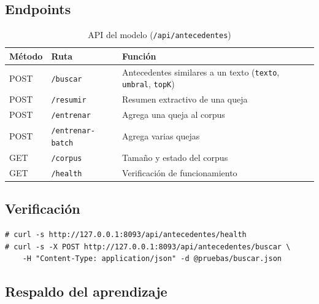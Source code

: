 \subsection{Endpoints}
\begin{table}[H]
\centering
\caption{API del modelo (\texttt{/api/antecedentes})}
\begin{tabular}{llp{7cm}}
\toprule
\textbf{Método} & \textbf{Ruta} & \textbf{Función} \\
\midrule
POST & \texttt{/buscar} & Antecedentes similares a un texto (\texttt{texto}, \texttt{umbral}, \texttt{topK}) \\
POST & \texttt{/resumir} & Resumen extractivo de una queja \\
POST & \texttt{/entrenar} & Agrega una queja al corpus \\
POST & \texttt{/entrenar-batch} & Agrega varias quejas \\
GET & \texttt{/corpus} & Tamaño y estado del corpus \\
GET & \texttt{/health} & Verificación de funcionamiento \\
\bottomrule
\end{tabular}
\end{table}

\subsection{Verificación}
\begin{lstlisting}
# curl -s http://127.0.0.1:8093/api/antecedentes/health
# curl -s -X POST http://127.0.0.1:8093/api/antecedentes/buscar \
    -H "Content-Type: application/json" -d @pruebas/buscar.json
\end{lstlisting}

\subsection{Respaldo del aprendizaje}

